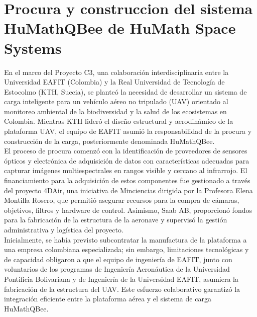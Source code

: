 \chapter{Procura y construccion del sistema HuMath\textregistered QBee de HuMath Space Systems}   

\noindent En el marco del Proyecto C3, una colaboración interdisciplinaria entre la Universidad EAFIT (Colombia) y la Real Universidad de Tecnología de Estocolmo (KTH, Suecia), se planteó la necesidad de desarrollar un sistema de carga inteligente para un vehículo aéreo no tripulado (UAV) orientado al monitoreo ambiental de la biodiversidad y la salud de los ecosistemas en Colombia. Mientras KTH lideró el diseño estructural y aerodinámico de la plataforma UAV, el equipo de EAFIT asumió la responsabilidad de la procura y construcción de la carga, posteriormente denominada HuMath\textregistered QBee.\\

\noindent El proceso de procura comenzó con la identificación de proveedores de sensores ópticos y electrónica de adquisición de datos con características adecuadas para capturar imágenes multiespectrales en rangos visible y cercano al infrarrojo. El financiamiento para la adquisición de estos componentes fue gestionado a través del proyecto 4DAir, una iniciativa de Minciencias dirigida por la Profesora Elena Montilla Rosero, que permitió asegurar recursos para la compra de cámaras, objetivos, filtros y hardware de control. Asimismo, Saab AB, proporcionó fondos para la fabricación de la estructura de la aeronave y supervisó la gestión administrativa y logística del proyecto.\\

\noindent Inicialmente, se había previsto subcontratar la manufactura de la plataforma a una empresa colombiana especializada; sin embargo, limitaciones tecnológicas y de capacidad obligaron a que el equipo de ingeniería de EAFIT, junto con voluntarios de los programas de Ingeniería Aeronáutica de la Universidad Pontificia Bolivariana y de Ingeniería de la Universidad EAFIT, asumiera la fabricación de la estructura del UAV. Este esfuerzo colaborativo garantizó la integración eficiente entre la plataforma aérea y el sistema de carga HuMath\textregistered QBee.\\



